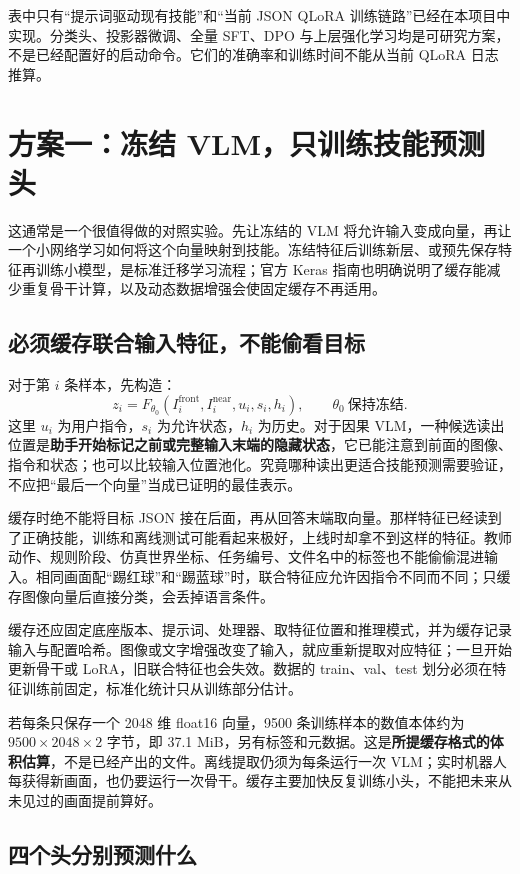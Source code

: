 表中只有“提示词驱动现有技能”和“当前 JSON QLoRA 训练链路”已经在本项目中实现。分类头、投影器微调、全量 SFT、DPO 与上层强化学习均是可研究方案，不是已经配置好的启动命令。它们的准确率和训练时间不能从当前 QLoRA 日志推算。

\section{方案一：冻结 VLM，只训练技能预测头}

这通常是一个很值得做的对照实验。先让冻结的 VLM 将允许输入变成向量，再让一个小网络学习如何将这个向量映射到技能。冻结特征后训练新层、或预先保存特征再训练小模型，是标准迁移学习流程；官方 Keras 指南也明确说明了缓存能减少重复骨干计算，以及动态数据增强会使固定缓存不再适用。\cite{transfer-feature-cache}

\subsection{必须缓存联合输入特征，不能偷看目标}

对于第 $i$ 条样本，先构造：
\[
z_i=F_{\theta_0}(I_i^{\mathrm{front}},I_i^{\mathrm{near}},
u_i,s_i,h_i),\qquad \theta_0\ \text{保持冻结}.
\]
这里 $u_i$ 为用户指令，$s_i$ 为允许状态，$h_i$ 为历史。对于因果 VLM，一种候选读出位置是\textbf{助手开始标记之前或完整输入末端的隐藏状态}，它已能注意到前面的图像、指令和状态；也可以比较输入位置池化。究竟哪种读出更适合技能预测需要验证，不应把“最后一个向量”当成已证明的最佳表示。

缓存时绝不能将目标 JSON 接在后面，再从回答末端取向量。那样特征已经读到了正确技能，训练和离线测试可能看起来极好，上线时却拿不到这样的特征。教师动作、规则阶段、仿真世界坐标、任务编号、文件名中的标签也不能偷偷混进输入。相同画面配“踢红球”和“踢蓝球”时，联合特征应允许因指令不同而不同；只缓存图像向量后直接分类，会丢掉语言条件。

缓存还应固定底座版本、提示词、处理器、取特征位置和推理模式，并为缓存记录输入与配置哈希。图像或文字增强改变了输入，就应重新提取对应特征；一旦开始更新骨干或 LoRA，旧联合特征也会失效。数据的 train、val、test 划分必须在特征训练前固定，标准化统计只从训练部分估计。

若每条只保存一个 2048 维 float16 向量，9500 条训练样本的数值本体约为 $9500\times2048\times2$ 字节，即 37.1 MiB，另有标签和元数据。这是\textbf{所提缓存格式的体积估算}，不是已经产出的文件。离线提取仍须为每条运行一次 VLM；实时机器人每获得新画面，也仍要运行一次骨干。缓存主要加快反复训练小头，不能把未来从未见过的画面提前算好。

\subsection{四个头分别预测什么}

